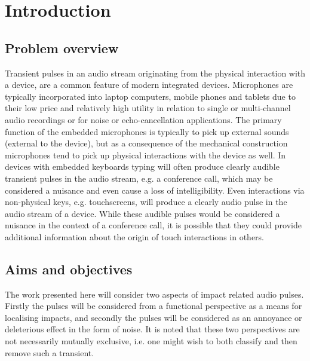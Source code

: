 \chapter{Introduction}\label{ch:Introduction}
\ifpdf
    \graphicspath{{Introduction/IntroductionFigs/PNG/}{Introduction/IntroductionFigs/PDF/}{Introduction/IntroductionFigs/}}
\else
    \graphicspath{{Introduction/IntroductionFigs/EPS/}{Introduction/IntroductionFigs/}}
\fi

\section{Problem overview}
Transient pulses in an audio stream originating from the physical interaction with a device, are a common feature of modern integrated devices. Microphones are typically incorporated into laptop computers, mobile phones and tablets due to their low price and relatively high utility in relation to single or multi-channel audio recordings or for noise or echo-cancellation applications. The primary function of the embedded microphones is typically to pick up external sounds (external to the device), but as a consequence of the mechanical construction microphones tend to pick up physical interactions with the device as well. In devices with embedded keyboards typing will often produce clearly audible transient pulses in the audio stream, e.g. a conference call, which may be considered a nuisance and even cause a loss of intelligibility. Even interactions via non-physical keys, e.g. touchscreens, will produce a clearly audio pulse in the audio stream of a device. While these audible pulses would be considered a nuisance in the context of a conference call, it is possible that they could provide additional information about the origin of touch interactions in others.

\section{Aims and objectives}
The work presented here will consider two aspects of impact related audio pulses. Firstly the pulses will be considered from a functional perspective as a means for localising impacts, and secondly the pulses will be considered as an annoyance or deleterious effect in the form of noise. It is noted that these two perspectives are not necessarily mutually exclusive, i.e. one might wish to both classify and then remove such a transient.


